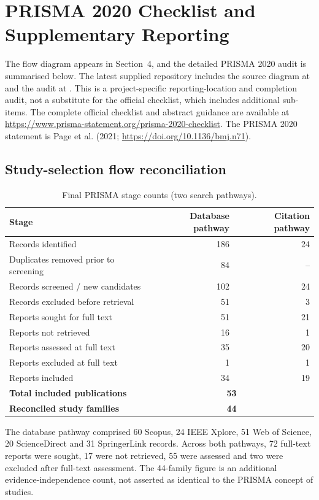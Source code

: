 \section{PRISMA 2020 Checklist and Supplementary Reporting}
\label{app:prisma}
The flow diagram appears in Section~4, and the detailed PRISMA 2020 audit is summarised below. The latest supplied repository includes the source diagram at  and the audit at . This is a project-specific reporting-location and completion audit, not a substitute for the official checklist, which includes additional sub-items. The complete official checklist and abstract guidance are available at \url{https://www.prisma-statement.org/prisma-2020-checklist}. The PRISMA 2020 statement is Page et al. (2021; \url{https://doi.org/10.1136/bmj.n71}).
\subsection{Study-selection flow reconciliation}
\begin{table}[htbp]\centering\small
\caption{Final PRISMA stage counts (two search pathways).}\label{tab:app_prisma_counts}
\begin{tabularx}{\textwidth}{@{}Xrr@{}}\toprule Stage & Database pathway & Citation pathway \\\midrule
Records identified & 186 & 24\\
Duplicates removed prior to screening & 84 & --\\
Records screened / new candidates & 102 & 24\\
Records excluded before retrieval & 51 & 3\\
Reports sought for full text & 51 & 21\\
Reports not retrieved & 16 & 1\\
Reports assessed at full text & 35 & 20\\
Reports excluded at full text & 1 & 1\\
Reports included & 34 & 19\\
\midrule \textbf{Total included publications} & \multicolumn{2}{c}{\textbf{53}}\\
\textbf{Reconciled study families} & \multicolumn{2}{c}{\textbf{44}}\\
\bottomrule\end{tabularx}\end{table}
The database pathway comprised 60 Scopus, 24 IEEE Xplore, 51 Web of Science, 20 ScienceDirect and 31 SpringerLink records. Across both pathways, 72 full-text reports were sought, 17 were not retrieved, 55 were assessed and two were excluded after full-text assessment. The 44-family figure is an additional evidence-independence count, not asserted as identical to the PRISMA concept of studies.
